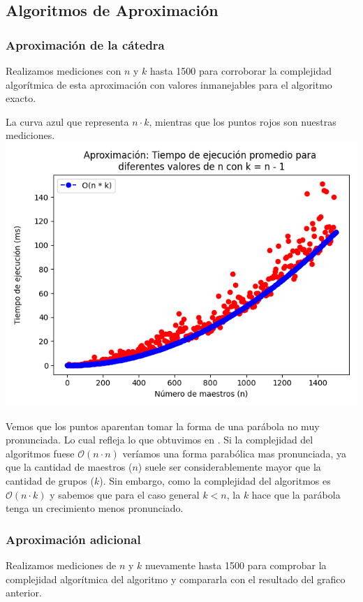 \documentclass{article}
\begin{document}
\subsection{Algoritmos de Aproximación}
\subsubsection{Aproximación de la cátedra}
Realizamos mediciones con $n$ y $k$ hasta 1500 para corroborar la complejidad algorítmica de esta aproximación con valores inmanejables para el algoritmo exacto.

La curva azul que representa $n \cdot k$, mientras que los puntos rojos son nuestras mediciones. 
\includegraphics[scale=0.60]{images/graficoAproxCatedra2.png}

Vemos que los puntos aparentan tomar la forma de una parábola no muy pronunciada. Lo cual refleja lo que obtuvimos en .
Si la complejidad del algoritmos fuese $\mathcal{O}(n \cdot n)$ veríamos una forma parabólica mas pronunciada, ya que la cantidad de maestros ($n$) suele ser considerablemente mayor que la cantidad de grupos ($k$). 
Sin embargo, como la complejidad del algoritmos es $\mathcal{O}(n \cdot k)$ y sabemos que para el caso general $k < n$, la $k$ hace que la parábola tenga un crecimiento menos pronunciado.


\subsubsection{Aproximación adicional}

Realizamos mediciones de $n$ y $k$ nuevamente hasta 1500 para comprobar la complejidad algorítmica del algoritmo y compararla con el resultado del grafico anterior.
\end{document}
